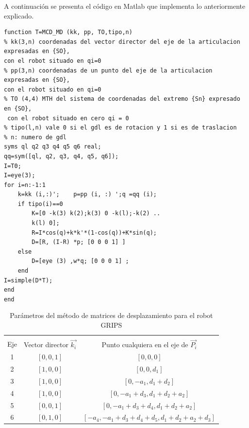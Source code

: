 

A continuación se presenta el código en Matlab que implementa lo anteriormente explicado.
\begin{lstlisting}
function T=MCD_MD (kk, pp, TO,tipo,n)
% kk(3,n) coordenadas del vector director del eje de la articulacion expresadas en {SO}, 
con el robot situado en qi=0
% pp(3,n) coordenadas de un punto del eje de la articulacion expresadas en {SO}, 
con el robot situado en qi=0
% TO (4,4) MTH del sistema de coordenadas del extremo {Sn} expresado en {SO},
 con el robot situado en cero qi = 0
% tipo(l,n) vale 0 si el gdl es de rotacion y 1 si es de traslacion
% n: numero de gdl
syms ql q2 q3 q4 q5 q6 real;
qq=sym([ql, q2, q3, q4, q5, q6]);
I=T0;
I=eye(3);
for i=n:-1:1
	k=kk (i,:)'; 	p=pp (i, :) ';q	=qq (i);
	if tipo(i)==0
		K=[0 -k(3) k(2);k(3) 0 -k(l);-k(2) ..
		k(l) 0];
		R=I*cos(q)+k*k'*(1-cos(q))+K*sin(q);
		D=[R, (I-R) *p; [0 0 0 1] ]
	else
		D=[eye (3) ,w*q; [0 0 0 1] ;
	end
I=simple(D*T);
end
end
 \end{lstlisting}  







\begin{table}[htb!]
\centering
\caption{Parámetros del método de matrices de desplazamiento para el robot GRIPS}
\label{tab:desplazamientoGrips}
\begin{tabular}{c c c}
\hline \\
Eje & Vector director $\vec{k_i}$ & Punto cualquiera en el eje de $\vec{P_i}$ \\
1				& $[0,0,1] $ &  $[0,0,0]$\\
2				& $[1,0,0] $ &  $[0,0,d_1]$\\
3				& $[1,0,0] $ &  $[0,-a_1,d_1+d_2]$\\
4				& $[1,0,0] $ &  $[0,-a_1+d_3,d_1+d_2+a_2]$\\
5				& $[0,0,1] $ &  $[0,-a_1+d_3+d_4,d_1+d_2+a_2]$\\
6				& $[0,1,0] $ &  $[-a_4,-a_1+d_3+d_4+d_5,d_1+d_2+a_2+d_3]$\\
\hline
\end{tabular}
\end{table}






